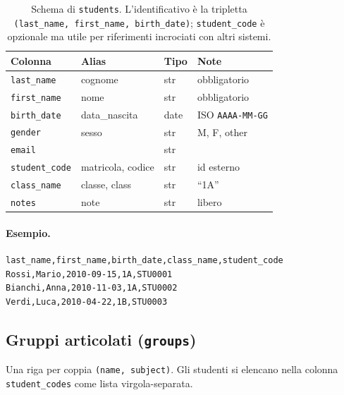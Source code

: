 \begin{table}[h]
\centering\small
\begin{tabular}{l l l p{4.6cm}}
\toprule
\textbf{Colonna} & \textbf{Alias} & \textbf{Tipo} & \textbf{Note} \\
\midrule
\texttt{last\_name} & cognome & str & obbligatorio \\
\texttt{first\_name} & nome & str & obbligatorio \\
\texttt{birth\_date} & data\_nascita & date & ISO \texttt{AAAA-MM-GG} \\
\texttt{gender} & sesso & str & M, F, other \\
\texttt{email} & & str & \\
\texttt{student\_code} & matricola, codice & str & id esterno \\
\texttt{class\_name} & classe, class & str & ``1A'' \\
\texttt{notes} & note & str & libero \\
\bottomrule
\end{tabular}
\caption{Schema di \texttt{students}. L'identificativo \`e la
tripletta \texttt{(last\_name, first\_name, birth\_date)};
\texttt{student\_code} \`e opzionale ma utile per riferimenti
incrociati con altri sistemi.}
\label{tab:formato_students}
\end{table}

\paragraph{Esempio.}
\begin{lstlisting}
last_name,first_name,birth_date,class_name,student_code
Rossi,Mario,2010-09-15,1A,STU0001
Bianchi,Anna,2010-11-03,1A,STU0002
Verdi,Luca,2010-04-22,1B,STU0003
\end{lstlisting}

\subsection{Gruppi articolati (\texttt{groups})}

Una riga per coppia \texttt{(name, subject)}. Gli studenti si
elencano nella colonna \texttt{student\_codes} come lista
virgola-separata.

